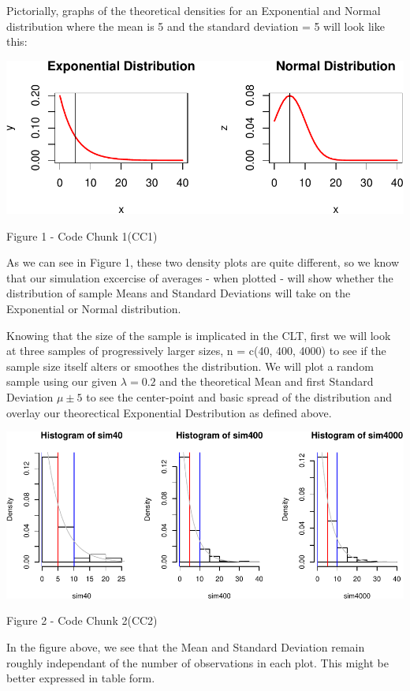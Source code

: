 \documentclass[]{article}
\begin{document}
Pictorially, graphs of the theoretical densities for an Exponential and
Normal distribution where the mean is 5 and the standard deviation = 5
will look like this:

\includegraphics{06_Project1a_files/figure-latex/theoretical_distro-1.pdf}

Figure 1 - Code Chunk 1(CC1)

As we can see in Figure 1, these two density plots are quite different,
so we know that our simulation excercise of averages - when plotted -
will show whether the distribution of sample Means and Standard
Deviations will take on the Exponential or Normal distribution.

Knowing that the size of the sample is implicated in the CLT, first we
will look at three samples of progressively larger sizes, n = c(40, 400,
4000) to see if the sample size itself alters or smoothes the
distribution. We will plot a random sample using our given
$\lambda = 0.2$ and the theoretical Mean and first Standard Deviation
$\mu \pm 5$ to see the center-point and basic spread of the distribution
and overlay our theorectical Exponential Destribution as defined above.

\includegraphics{06_Project1a_files/figure-latex/simulations-1.pdf}

Figure 2 - Code Chunk 2(CC2)

In the figure above, we see that the Mean and Standard Deviation remain
roughly independant of the number of observations in each plot. This
might be better expressed in table form.
\end{document}
